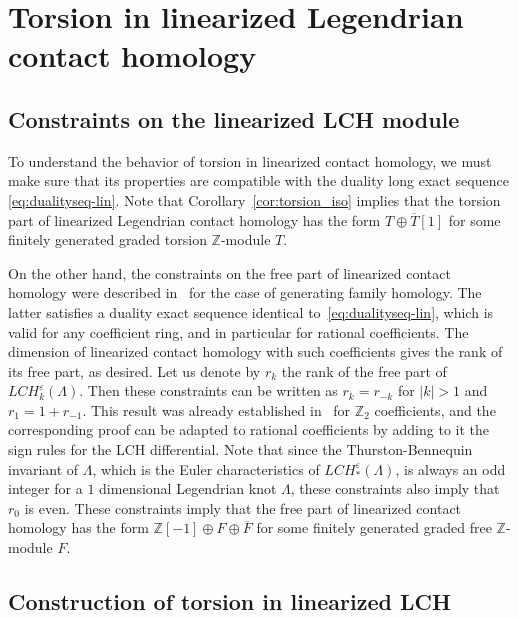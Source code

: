 \documentclass[11pt]{amsart}
\theoremstyle{plain}
\theoremstyle{remark}
\numberwithin{equation}{section}
\newcommand{\Z}{\ensuremath{\mathbb{Z}}}
\begin{document}
\section{Torsion in linearized Legendrian contact homology} \label{sec:torsion_lin}

\subsection{Constraints on the linearized LCH module}
\label{sec:constraints_lin}

To understand the behavior of torsion in linearized contact homology, we must make sure that its properties are compatible with the duality long exact sequence \eqref{eq:dualityseq-lin}. Note that Corollary~\ref{cor:torsion_iso} implies that the torsion part of linearized Legendrian contact homology has the form $T \oplus \overline{T}[1]$
for some finitely generated graded torsion $\Z$-module $T$.

On the other hand, the constraints on the free part of linearized contact homology were described in~\cite[Theorem~1.1]{BST} for the case of 
generating family homology. The latter satisfies a duality exact sequence identical to~\eqref{eq:dualityseq-lin}, which is valid for any coefficient ring, and 
in particular for rational coefficients. The dimension of linearized contact homology with such coefficients gives the rank of its free part, as desired.
Let us denote by $r_k$ the rank of the free part of $LCH_{k}^{\varepsilon}(\Lambda)$. Then these constraints can be written as $r_k = r_{-k}$ for
$|k| > 1$ and $r_1 = 1 + r_{-1}$. This result was already established in~\cite{S} for $\Z_2$ coefficients, and the corresponding proof can be 
adapted to rational coefficients by adding to it the sign rules for the LCH differential. Note that since the Thurston-Bennequin invariant of $\Lambda$, 
which is the Euler characteristics of $LCH_{*}^{\varepsilon}(\Lambda)$, is always an odd integer for a $1$ dimensional Legendrian knot $\Lambda$, 
these constraints also imply that $r_0$ is even. These constraints imply that the free part of linearized contact homology has the form $\Z[-1] \oplus F
\oplus \overline{F}$ for some finitely generated graded free $\Z$-module $F$.



\subsection{Construction of torsion in linearized LCH} 
\label{sec:torsionlin}
\end{document}
